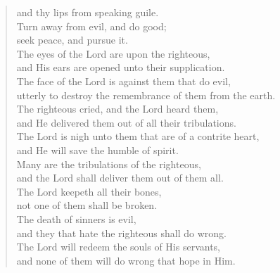 {\begin{verse}
				and thy lips from speaking guile.\nolinebreak\\
				Turn away from evil, and do good;\nolinebreak\\
				seek peace, and pursue it.\nolinebreak\\
				The eyes of the Lord are upon the righteous,\nolinebreak\\
				and His ears are opened unto their supplication.\nolinebreak\\
				The face of the Lord is against them that do evil,\nolinebreak\\
				utterly to destroy the remembrance of them from the earth.\nolinebreak\\
				The righteous cried, and the Lord heard them,\nolinebreak\\
				and He delivered them out of all their tribulations.\nolinebreak\\
				The Lord is nigh unto them that are of a contrite heart,\nolinebreak\\
				and He will save the humble of spirit.\nolinebreak\\
				Many are the tribulations of the righteous,\nolinebreak\\
				and the Lord shall deliver them out of them all.\nolinebreak\\
				The Lord keepeth all their bones,\nolinebreak\\
				not one of them shall be broken.\nolinebreak\\
				The death of sinners is evil,\nolinebreak\\
				and they that hate the righteous shall do wrong.\nolinebreak\\
				The Lord will redeem the souls of His servants,\nolinebreak\\
				and none of them will do wrong that hope in Him.
			\end{verse}
}
